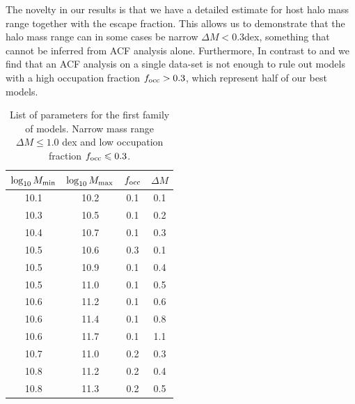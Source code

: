 \documentclass[usenatbib]{mn2e}
\begin{document}
The novelty in our results is that we have a detailed estimate for 
host halo mass range together with the escape fraction. This allows us
to demonstrate that the halo mass range can in some cases be narrow $\Delta M <
0.3$dex, something that cannot be inferred from ACF analysis alone.
Furthermore, In contrast to \citep{Gawiser07} and \citep{Ouchi2010} we
find that an ACF analysis on a single data-set is not enough to rule
out models with a high occupation fraction $f_{\rm occ}>0.3$, which
represent half of our best models. 

\begin{table}
\begin{center}
\begin{tabular}{cccc}\hline\hline
$\log_{10}M_{\rm min}$ & $\log_{10}M_{\rm max}$ & $f_{\rm occ}$ & $\Delta M$\\\hline
10.1 &10.2 & 0.1 & 0.1\\
10.3 &10.5 & 0.1 & 0.2\\
10.4 &10.7 & 0.1 & 0.3\\
10.5 &10.6 & 0.3 & 0.1\\
10.5 &10.9 & 0.1 & 0.4\\
10.5 &11.0 & 0.1 & 0.5\\
10.6 &11.2 & 0.1 & 0.6\\
10.6 &11.4 & 0.1 & 0.8\\
10.6 &11.7 & 0.1 & 1.1\\
10.7 &11.0 & 0.2 & 0.3\\
10.8 &11.2 & 0.2 & 0.4\\
10.8 &11.3 & 0.2 & 0.5\\\hline
\end{tabular}
\end{center}
\caption{\label{table:firstfamily}List of parameters for the first
  family of models. Narrow mass range $\Delta M\leq 1.0$ dex and low
  occupation fraction $f_{\rm occ}\leq 0.3$.} 
\end{table}
\end{document}
